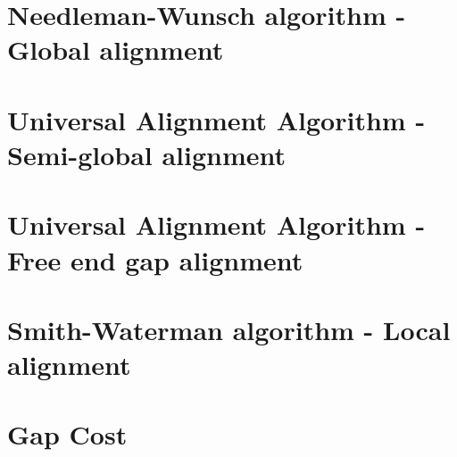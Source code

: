 

\section{Needleman-Wunsch algorithm - Global alignment}


\section{Universal Alignment Algorithm - Semi-global alignment}



\section{Universal Alignment Algorithm - Free end gap alignment}


\section{Smith-Waterman algorithm - Local alignment}



\section{Gap Cost}

